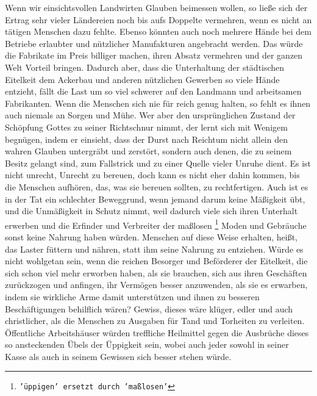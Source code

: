 {Wenn wir einsichtsvollen
Landwirten Glauben beimessen wollen, so ließe sich der
Ertrag sehr vieler Ländereien noch bis aufs Doppelte vermehren, wenn es nicht an
tätigen Menschen dazu fehlte. Ebenso könnten auch noch mehrere Hände bei dem
Betriebe erlaubter und nützlicher Manufakturen angebracht werden. Das würde die
Fabrikate im Preis billiger machen, ihren Absatz vermehren und der ganzen Welt
Vorteil bringen. Dadurch aber, dass die Unterhaltung der städtischen Eitelkeit
dem Ackerbau und anderen nützlichen Gewerben so viele Hände entzieht, fällt die
Last um so viel schwerer auf den Landmann und arbeitsamen Fabrikanten. Wenn die
Menschen sich nie für reich genug halten, so fehlt es ihnen auch niemals an
Sorgen und Mühe. Wer aber den ursprünglichen Zustand der Schöpfung Gottes zu
seiner Richtschnur nimmt, der lernt sich mit Wenigem begnügen, indem er
einsieht, dass der Durst nach Reichtum nicht allein den wahren
Glauben
untergräbt und zerstört, sondern auch denen, die zu seinem Besitz gelangt
sind, zum Fallstrick und zu einer Quelle vieler Unruhe dient. Es ist nicht
unrecht, Unrecht zu bereuen, doch kann es nicht eher dahin kommen, bis die
Menschen aufhören, das, was sie bereuen sollten, zu rechtfertigen. Auch ist es
in der Tat ein schlechter Beweggrund, wenn jemand darum keine Mäßigkeit übt,
und die Unmäßigkeit in Schutz nimmt, weil dadurch viele sich ihren Unterhalt
erwerben und die Erfinder und Verbreiter der maßlosen
\footnote{\texttt{'üppigen' ersetzt durch 'maßlosen'}} Moden und Gebräuche sonst
keine Nahrung haben würden. Menschen auf diese Weise erhalten, heißt, das Laster
füttern und nähren, statt ihm seine Nahrung zu entziehen. Würde es nicht
wohlgetan sein, wenn die reichen Besorger und Beförderer der Eitelkeit, die
sich schon viel mehr erworben haben, als sie brauchen, sich aus ihren Geschäften 
zurückzogen und anfingen, ihr Vermögen besser anzuwenden, als sie es erwarben,
indem sie wirkliche Arme damit unterstützen und ihnen zu besseren Beschäftigungen
behilflich wären? Gewiss, dieses wäre klüger, edler und auch christlicher, als die
Menschen zu Ausgaben für Tand und Torheiten zu verleiten. Öffentliche
Arbeitshäuser würden treffliche Heilmittel gegen die
Ausbrüche dieses so
ansteckenden Übels der Üppigkeit sein, wobei auch jeder sowohl in seiner Kasse
als auch 
in seinem Gewissen sich besser stehen würde.

\medskip

}
